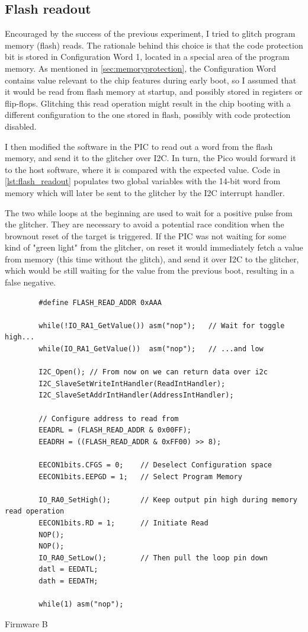 \documentclass[a4paper,english,twoside,10pt]{article}
\begin{document}
\subsection{Flash readout}\label{sect:flashreadout}
Encouraged by the success of the previous experiment, I tried to glitch program memory (flash) reads. The rationale behind this choice is that the code protection bit is stored in Configuration Word 1, located in a special area of the program memory. As mentioned in \cref{sec:memoryprotection}, the Configuration Word contains value relevant to the chip features during early boot, so I assumed that it would be read from flash memory at startup, and possibly stored in registers or flip-flops. Glitching this read operation might result in the chip booting with a different configuration to the one stored in flash, possibly with code protection disabled.

I then modified the software in the PIC to read out a word from the flash memory, and send it to the glitcher over I2C. In turn, the Pico would forward it to the host software, where it is compared with the expected value. Code in \cref{lst:flash_readout} populates two global variables with the 14-bit word from memory which will later be sent to the glitcher by the I2C interrupt handler.

The two while loops at the beginning are used to wait for a positive pulse from the glitcher. They are necessary to avoid a potential race condition when the brownout reset of the target is triggered. If the PIC was not waiting for some kind of "green light" from the glitcher, on reset it would immediately fetch a value from memory (this time without the glitch), and send it over I2C to the glitcher, which would be still waiting for the value from the previous boot, resulting in a false negative.

\begin{flushleft}
	\captionsetup{type=listing}
	\begin{verbatim}
		#define FLASH_READ_ADDR 0xAAA
	
		while(!IO_RA1_GetValue()) asm("nop");   // Wait for toggle high...
		while(IO_RA1_GetValue())  asm("nop");   // ...and low
	
		I2C_Open(); // From now on we can return data over i2c
		I2C_SlaveSetWriteIntHandler(ReadIntHandler);
		I2C_SlaveSetAddrIntHandler(AddressIntHandler);
	
		// Configure address to read from
		EEADRL = (FLASH_READ_ADDR & 0x00FF);
		EEADRH = ((FLASH_READ_ADDR & 0xFF00) >> 8);
	
		EECON1bits.CFGS = 0;    // Deselect Configuration space
		EECON1bits.EEPGD = 1;   // Select Program Memory
	
		IO_RA0_SetHigh();       // Keep output pin high during memory read operation
		EECON1bits.RD = 1;      // Initiate Read
		NOP();
		NOP();
		IO_RA0_SetLow();        // Then pull the loop pin down
		datl = EEDATL;
		dath = EEDATH;
	
		while(1) asm("nop");
	\end{verbatim}
	\caption{Firmware B}\label{lst:flash_readout}
\end{flushleft}
\end{document}
